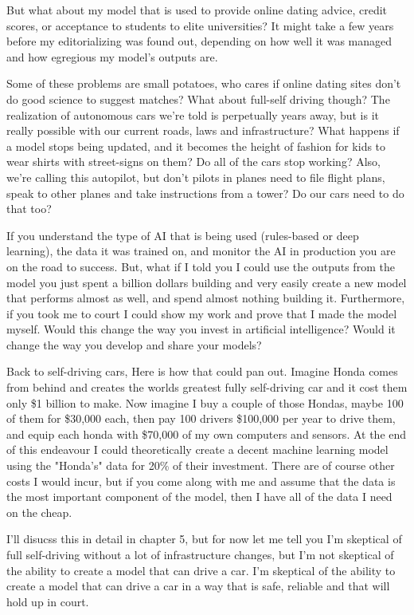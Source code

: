 But what about my model that is used to provide online dating advice, credit scores, or acceptance to students to elite universities? It might take a few years before my editorializing was found out, depending on how well it was managed and how egregious my model's outputs are.

Some of these problems are small potatoes, who cares if online dating sites don't do good science to suggest matches? What about full-self driving though? The realization of autonomous cars we're told is perpetually years away, but is it really possible with our current roads, laws and infrastructure? What happens if a model stops being updated, and it becomes the height of fashion for kids to wear shirts with street-signs on them? Do all of the cars stop working? Also, we're calling this autopilot, but don't pilots in planes need to file flight plans, speak to other planes and take instructions from a tower? Do our cars need to do that too? 

If you understand the type of AI that is being used (rules-based or deep learning), the data it was trained on, and monitor the AI in production you are on the road to success. But, what if I told you I could use the outputs from the model you just spent a billion dollars building and very easily create a new model that performs almost as well, and spend almost nothing building it. Furthermore, if you took me to court I could show my work and prove that I made the model myself. Would this change the way you invest in artificial intelligence? Would it change the way you develop and share your models?

Back to self-driving cars, Here is how that could pan out. Imagine Honda comes from behind and creates the worlds greatest fully self-driving car and it cost them only \$1 billion to make. Now imagine I buy a couple of those Hondas, maybe 100 of them for \$30,000 each, then pay 100 drivers \$100,000 per year to drive them, and equip each honda with \$70,000 of my own computers and sensors. At the end of this endeavour I could theoretically create a decent machine learning model using the "Honda's" data for 20\% of their investment. There are of course other costs I would incur, but if you come along with me and assume that the data is the most important component of the model, then I have all of the data I need on the cheap.

I'll disucss this in detail in chapter 5, but for now let me tell you I'm skeptical of full self-driving without a lot of infrastructure changes, but I'm not skeptical of the ability to create a model that can drive a car. I'm skeptical of the ability to create a model that can drive a car in a way that is safe, reliable and that will hold up in court.   

